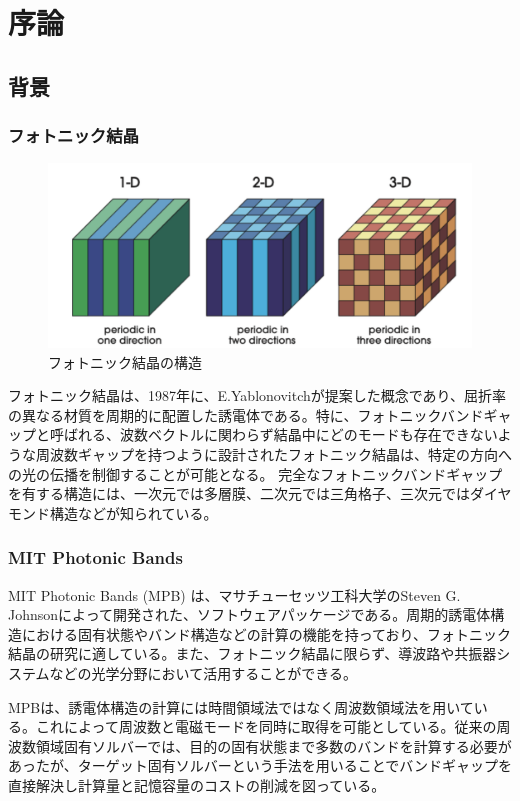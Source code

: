 \documentclass[platex,dvipdfmx,draft]{jsreport}
\numberwithin{equation}{section}
\begin{document}
\chapter{序論}


\section{背景}

\subsection{フォトニック結晶}

\begin{figure}[htbp]
  \centering
  \includegraphics[width=0.9\linewidth]{crystals.png}
  \caption{フォトニック結晶の構造}
  \label{fig:photonic_crystal}
\end{figure}


フォトニック結晶は、1987年に、E.Yablonovitchが提案した概念であり、屈折率の異なる材質を周期的に配置した誘電体である。特に、フォトニックバンドギャップと呼ばれる、波数ベクトルに関わらず結晶中にどのモードも存在できないような周波数ギャップを持つように設計されたフォトニック結晶は、特定の方向への光の伝播を制御することが可能となる。
完全なフォトニックバンドギャップを有する構造には、一次元では多層膜、二次元では三角格子、三次元ではダイヤモンド構造などが知られている。


\subsection{MIT Photonic Bands}

MIT Photonic Bands (MPB) は、マサチューセッツ工科大学のSteven G. Johnsonによって開発された、ソフトウェアパッケージである。周期的誘電体構造における固有状態やバンド構造などの計算の機能を持っており、フォトニック結晶の研究に適している。また、フォトニック結晶に限らず、導波路や共振器システムなどの光学分野において活用することができる。

MPBは、誘電体構造の計算には時間領域法ではなく周波数領域法を用いている。これによって周波数と電磁モードを同時に取得を可能としている。従来の周波数領域固有ソルバーでは、目的の固有状態まで多数のバンドを計算する必要があったが、ターゲット固有ソルバーという手法を用いることでバンドギャップを直接解決し計算量と記憶容量のコストの削減を図っている。
\end{document}
